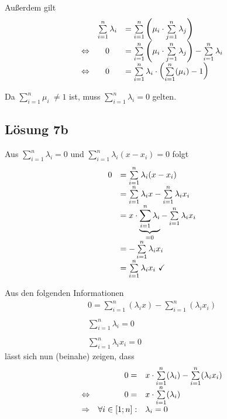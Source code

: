 \documentclass[main.tex]{subfiles}
\begin{document}
Außerdem gilt
\begin{equation*}
    \begin{array}{ c c l }
        & \sum\limits _{i=1}^{n} \lambda _{i} & =\sum\limits _{i=1}^{n}\left( \mu _{i} \cdotp \sum\limits _{j=1}^{n} \lambda _{j}\right)\\
        \Leftrightarrow  & 0 & =\sum\limits _{i=1}^{n}\left( \mu _{i} \cdotp \sum\limits _{j=1}^{n} \lambda _{j}\right) -\sum\limits _{i=1}^{n} \lambda _{i}\\
        \Leftrightarrow  & 0 & =\sum\limits _{i=1}^{n} \lambda _{i} \cdotp \left(\sum\limits _{i=1}^{n}( \mu _{i}) -1\right)
    \end{array}
\end{equation*}

Da $\sum _{i=1}^{n} \mu _{i} \ \neq 1$ ist, muss $\sum\nolimits _{i=1}^{n} \lambda _{i} =0$ gelten.

\subsection{Lösung 7b}

Aus $\sum\nolimits _{i=1}^{n} \lambda _{i} =0$ und $\sum\nolimits _{i=1}^{n} \lambda _{i}( x-x_{i}) =0$ folgt
\begin{equation*}
    \begin{array}{ c l }
    0 & =\sum\limits _{i=1}^{n} \lambda _{i}( x-x_{i})\\
    & =\sum\limits _{i=1}^{n} \lambda _{i} x-\sum\limits _{i=1}^{n} \lambda _{i} x_{i}\\
    & =x\cdotp \underbrace{\sum\limits _{i=1}^{n} \lambda _{i}}_{=0} -\sum\limits _{i=1}^{n} \lambda _{i} x_{i}\\
    & =-\sum\limits _{i=1}^{n} \lambda _{i} x_{i}\\
    & =\sum\limits _{i=1}^{n} \lambda _{i} x_{i} \ \checked 
    \end{array}
\end{equation*}

Aus den folgenden Informationen
\begin{gather*}
    0=\sum\limits _{i=1}^{n}( \lambda _{i} x) -\sum\limits _{i=1}^{n}( \lambda _{i} x_{i})\\
    \\
    \sum\limits _{i=1}^{n} \lambda _{i} =0\\
    \\
    \sum\limits _{i=1}^{n} \lambda _{i} x_{i} =0
\end{gather*}
lässt sich nun (beinahe) zeigen, dass
\begin{equation*}
    \begin{array}{ c r l }
        & 0= & x\cdotp \sum\limits _{i=1}^{n}( \lambda _{i}) -\sum\limits _{i=1}^{n}( \lambda _{i} x_{i})\\
        \Leftrightarrow  & 0= & x\cdotp \sum\limits _{i=1}^{n}( \lambda _{i})\\
        \Rightarrow  & \forall i\in [ 1;n] : & \lambda _{i} =0
    \end{array}
\end{equation*}
\end{document}
